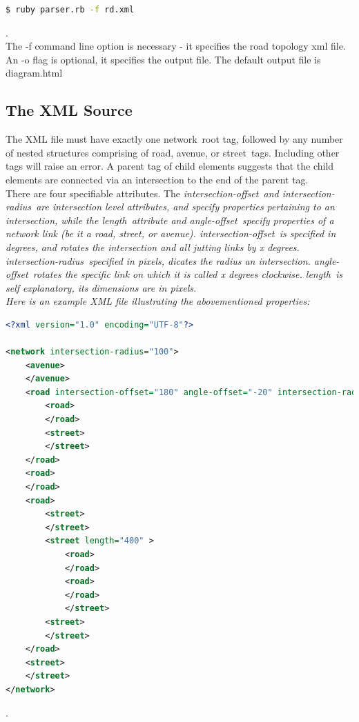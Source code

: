 \documentclass{article}
\begin{document}
\begin{lstlisting}[language=bash]
  $ ruby parser.rb -f rd.xml
\end{lstlisting}.\\

The -f command line option is necessary - it specifies the road topology xml file. An -o flag is optional, it specifies the output file. The default output file is diagram.html

\subsection{The XML Source}

The XML file must have exactly one \textlangle network\textrangle\ root tag, followed by any number of nested structures comprising of \textlangle road\textrangle, \textlangle avenue\textrangle, or \textlangle street\textrangle\ tags. Including other tags will raise an error. A parent tag of child elements suggests that the child elements are connected via an intersection to the end of the parent tag.\\

There are four specifiable attributes. The \em{intersection-offset}\em\ and \em{intersection-radius}\em\ are intersection level attributes, and specify properties pertaining to an intersection, while the \em{length}\em\ attribute and \em{angle-offset}\em\ specify properties of a network link (be it a road, street, or avenue). \em{intersection-offset}\em\ is specified in degrees, and rotates the intersection and all jutting links by x degrees. \em{intersection-radius}\em\, specified in pixels, dicates the radius an intersection. \em{angle-offset}\em\ rotates the specific link on which it is called x degrees clockwise. \em{length}\em\ is self explanatory, its dimensions are in pixels.\\

Here is an example XML file illustrating the abovementioned properties:\\

\begin{lstlisting}[language=xml]
<?xml version="1.0" encoding="UTF-8"?>

<network intersection-radius="100">
	<avenue>
	</avenue>
	<road intersection-offset="180" angle-offset="-20" intersection-radius="20">
		<road>
		</road>
		<street>
		</street>
	</road>
	<road>
	</road>
	<road>
		<street>
		</street>
		<street length="400" >
			<road>
			</road>
			<road>
			</road>
			</street>
		<street>
		</street>
	</road>
	<street>
	</street>
</network>
\end{lstlisting}.\\
\end{document}
